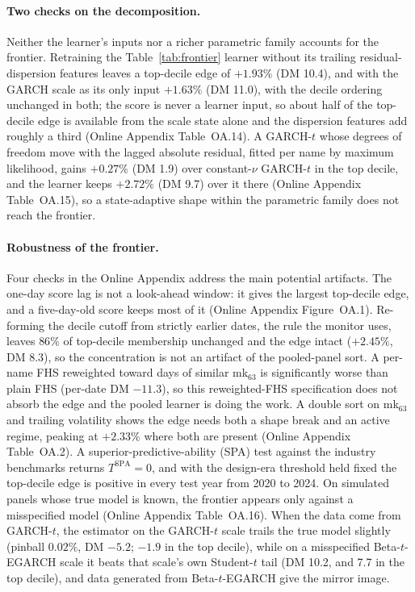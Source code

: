 \documentclass[11pt]{article}
\theoremstyle{remark}
\begin{document}
\paragraph{Two checks on the decomposition.} Neither the learner's inputs
nor a richer parametric family accounts for the frontier. Retraining the
Table~\ref{tab:frontier} learner without its trailing residual-dispersion
features leaves a top-decile edge of $+1.93\%$ (DM 10.4), and with the
GARCH scale as its only input $+1.63\%$ (DM 11.0), with the decile
ordering unchanged in both; the score is never a learner input, so about
half of the top-decile edge is available from the scale state alone and
the dispersion features add roughly a third (Online Appendix
Table~OA.14). A GARCH-$t$ whose degrees of freedom move with the lagged
absolute residual, fitted per name by maximum likelihood, gains $+0.27\%$
(DM 1.9) over constant-$\nu$ GARCH-$t$ in the top decile, and the
learner keeps $+2.72\%$ (DM 9.7) over it there (Online Appendix
Table~OA.15), so a state-adaptive shape within the parametric family does
not reach the frontier.

\paragraph{Robustness of the frontier.} Four checks in the Online Appendix address the main potential artifacts. The one-day score lag is not a
look-ahead window: it gives the largest top-decile edge, and a
five-day-old score keeps most of it (Online Appendix Figure~OA.1).
Re-forming the decile cutoff from strictly earlier dates, the rule the
monitor uses, leaves $86\%$ of top-decile membership unchanged and the
edge intact ($+2.45\%$, DM 8.3), so the concentration is not an artifact
of the pooled-panel sort. A per-name FHS reweighted toward days of
similar mk$_{63}$ is significantly worse than plain FHS (per-date DM
$-11.3$), so this reweighted-FHS specification does not absorb the edge and the
pooled learner is doing the work. A double sort on mk$_{63}$ and trailing
volatility shows the edge needs both a shape break and an active regime,
peaking at $+2.33\%$ where both are present (Online Appendix
Table~OA.2). A superior-predictive-ability (SPA) test \citep{hansen2005spa}
against the industry benchmarks returns $T^{\mathrm{SPA}}=0$, and with
the design-era threshold held fixed the top-decile edge is positive in
every test year from 2020 to 2024. On simulated panels whose true model is known, the frontier appears only against a misspecified model (Online Appendix Table~OA.16). When the data come from GARCH-$t$, the estimator on the GARCH-$t$ scale trails the true model slightly (pinball $0.02\%$, DM $-5.2$; $-1.9$ in the top decile), while on a misspecified Beta-$t$-EGARCH scale it beats that scale's own Student-$t$ tail (DM 10.2, and 7.7 in the top decile), and data generated from Beta-$t$-EGARCH give the mirror image.
\end{document}
